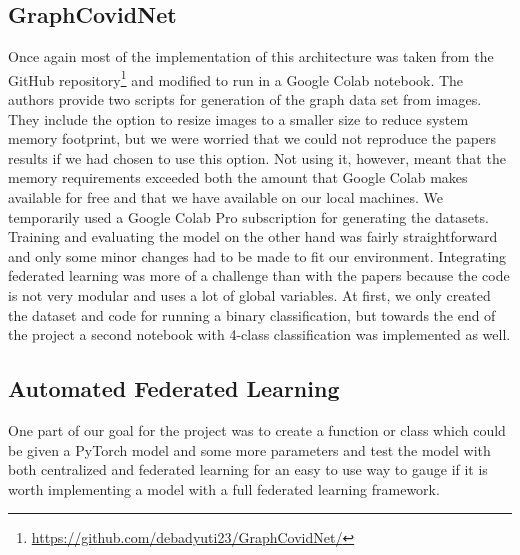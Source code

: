 \subsection{GraphCovidNet}
Once again most of the implementation of this architecture was taken from the GitHub repository\footnote{\url{https://github.com/debadyuti23/GraphCovidNet/}} and modified to run in a Google Colab notebook. 
The authors provide two scripts for generation of the graph data set from images. They include the option to resize images to a smaller size to reduce system memory footprint, but we were worried that we could not reproduce the papers results if we had chosen to use this option. Not using it, however, meant that the memory requirements exceeded both the amount that Google Colab makes available for free and that we have available on our local machines. We temporarily used a Google Colab Pro subscription for generating the datasets.
Training and evaluating the model on the other hand was fairly straightforward and only some minor changes had to be made to fit our environment. Integrating federated learning was more of a challenge than with the papers because the code is not very modular and uses a lot of global variables.
At first, we only created the dataset and code for running a binary classification, but towards the end of the project a second notebook with 4-class classification was implemented as well.

\subsection{Automated Federated Learning}\label{subsec:methods_automated_fl}
One part of our goal for the project was to create a function or class which could be given a PyTorch model and some more parameters and test the model with both centralized and federated learning for an easy to use way to gauge if it is worth implementing a model with a full federated learning framework. 

